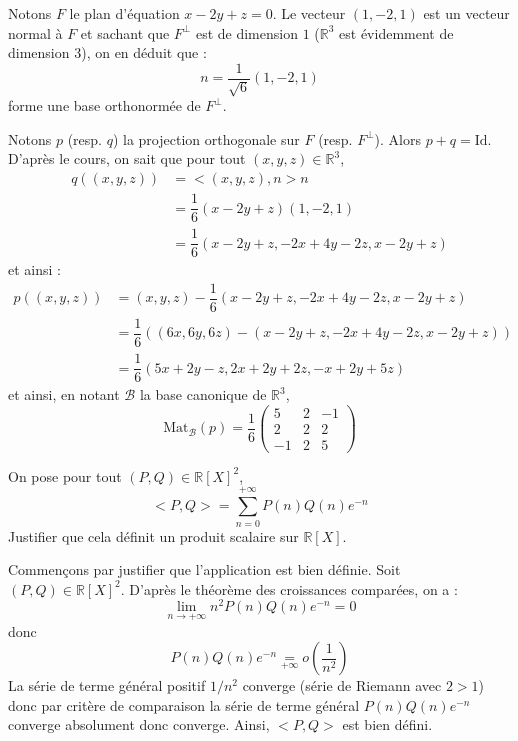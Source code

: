 \documentclass[a4paper,10pt]{report}
\begin{document}
\corr Notons $F$ le plan d'équation $x-2y+z=0$. Le vecteur $(1,-2,1)$ est un vecteur normal à $F$ et sachant que $F^{\perp}$ est de dimension $1$ ($\mathbb{R}^3$ est évidemment de dimension $3$), on en déduit que :
$$ n = \dfrac{1}{\sqrt{6}} (1,-2,1)$$
forme une base orthonormée de $F^{\perp}$. 

\medskip

\noindent Notons $p$ (resp. $q$) la projection orthogonale sur $F$ (resp. $F^{\perp}$). Alors $p+q=\textrm{Id}$. D'après le cours, on sait que pour tout $(x,y,z) \in \mathbb{R}^3$,
\begin{align*}
 q((x,y,z)) & = <(x,y,z),n>n  \\
 & = \dfrac{1}{6} (x-2y+z) (1,-2,1) \\
 & = \dfrac{1}{6} (x-2y+z,-2x+4y-2z,x-2y+z) 
 \end{align*}
 et ainsi :
 \begin{align*}
p((x,y,z)) & = (x,y,z) - \dfrac{1}{6} (x-2y+z,-2x+4y-2z,x-2y+z)  \\
& = \dfrac{1}{6} ( (6x,6y,6z) - (x-2y+z,-2x+4y-2z,x-2y+z)) \\
& = \dfrac{1}{6}(5x+2y-z, 2x+2y+2z,-x+2y+5z)
\end{align*}
et ainsi, en notant $\mathcal{B}$ la base canonique de $\mathbb{R}^3$,
$$ \textrm{Mat}_{\mathcal{B}}(p) = \dfrac{1}{6} \begin{pmatrix}
5 & 2& -1 \\
2 & 2 & 2 \\
-1 & 2& 5
\end{pmatrix}$$



\begin{Exercice}{} On pose pour tout $(P,Q) \in \mathbb{R}[X]^2$,
$$ <P,Q> = \sum_{n=0}^{+ \infty} P(n) Q(n) e^{-n} $$
Justifier que cela définit un produit scalaire sur $\mathbb{R}[X]$.
\end{Exercice}

\corr Commençons par justifier que l'application est bien définie. Soit $(P,Q) \in \mathbb{R}[X]^2$. D'après le théorème des croissances comparées, on a :
$$ \lim_{n \rightarrow + \infty} n^2 P(n)Q(n) e^{-n} = 0$$
donc
$$ P(n)Q(n) e^{-n} \underset{+ \infty}{=} o \left( \dfrac{1}{n^2} \right)$$
La série de terme général positif $1/n^2$ converge (série de Riemann avec $2>1$) donc par critère de comparaison la série de terme général $P(n)Q(n) e^{-n}$ converge absolument donc converge. Ainsi, $<P,Q>$ est bien défini.

\medskip
\end{document}
